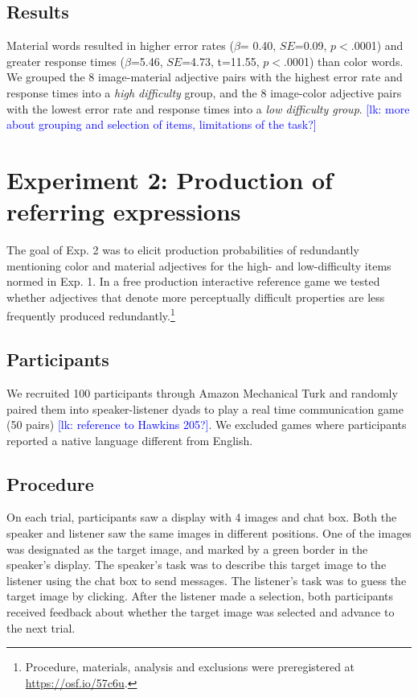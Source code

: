 \documentclass[12pt,letterpaper]{article}
\newcommand{\lk}[1]{\textcolor{Blue}{[lk: #1]}}
\begin{document}
\subsection{Results} Material words resulted in higher error rates ($\beta$= 0.40, $SE$=0.09, $p$$<$.0001) and greater response times ($\beta$=5.46, $SE$=4.73, t=11.55, $p$$<$.0001) than color words. We grouped the 8 image-material adjective pairs with the highest error rate and response times into a \textit{high difficulty} group, and the 8 image-color adjective pairs with the lowest error rate and response times into a \textit{low difficulty group}. \lk {more about grouping and selection of items, limitations of the task?}

  
\section{Experiment 2: Production of referring expressions} The goal of Exp. 2 was to elicit production probabilities of redundantly mentioning color and material adjectives for the high- and low-difficulty items normed in Exp. 1. In a free production interactive reference game we tested whether adjectives that denote more perceptually difficult properties are less frequently produced redundantly.\footnote{Procedure, materials, analysis and exclusions were preregistered at \href {https://osf.io/57c6u}{https://osf.io/57c6u}.}


\subsection{Participants} We recruited 100 participants through Amazon Mechanical Turk and randomly paired them into speaker-listener dyads to play a real time communication game (50 pairs) \lk {reference to Hawkins 205?}. We excluded games where participants reported a native language different from English.

\subsection{Procedure} On each trial, participants saw a display with 4 images and chat box. Both the speaker and listener saw the same images in different positions. One of the images was designated as the target image, and marked by a green border in the speaker's display. The speaker's task was to describe this target image to the listener using the chat box to send messages. The listener's task was to guess the target image by clicking. After the listener made a selection, both participants received feedback about whether the target image was selected and advance to the next trial. 
\end{document}

